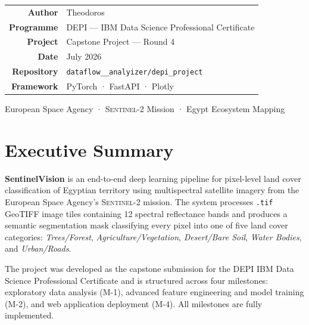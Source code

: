 \documentclass[12pt, a4paper]{article}
\newcommand{\sentinel}{\textsc{Sentinel-2}}
\newcommand{\tif}{\texttt{.tif}}
\begin{document}
\begin{titlepage}
\renewcommand{\arraystretch}{1.35}
\begin{tabular}{rl}
  \textbf{Author}      & Theodoros \\
  \textbf{Programme}   & DEPI — IBM Data Science Professional Certificate \\
  \textbf{Project}     & Capstone Project — Round 4 \\
  \textbf{Date}        & July 2026 \\
  \textbf{Repository}  & \texttt{dataflow\_\_analyizer/depi\_project} \\
  \textbf{Framework}   & PyTorch · FastAPI · Plotly \\
\end{tabular}

\vfill
{\color{white!40}\footnotesize
  European Space Agency · \sentinel{} Mission · Egypt Ecosystem Mapping}

\end{titlepage}

\pagecolor{white}
\color{black}

\newpage
\tableofcontents
\newpage

\section{Executive Summary}

\textbf{SentinelVision} is an end-to-end deep learning pipeline for pixel-level land cover classification of Egyptian territory using multispectral satellite imagery from the European Space Agency's \sentinel{} mission. The system processes \tif{} GeoTIFF image tiles containing 12 spectral reflectance bands and produces a semantic segmentation mask classifying every pixel into one of five land cover categories: \textit{Trees/Forest}, \textit{Agriculture/Vegetation}, \textit{Desert/Bare Soil}, \textit{Water Bodies}, and \textit{Urban/Roads}.

The project was developed as the capstone submission for the DEPI IBM Data Science Professional Certificate and is structured across four milestones: exploratory data analysis (M-1), advanced feature engineering and model training (M-2), and web application deployment (M-4). All milestones are fully implemented.
\end{document}
